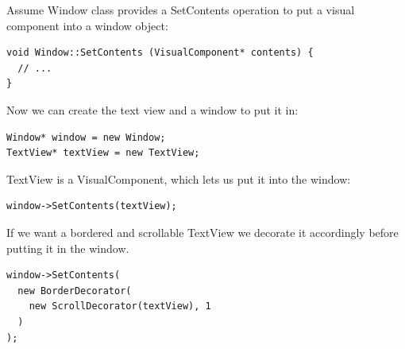 \documentclass[11pt]{report}
\begin{document}
Assume Window class provides a SetContents operation to put a visual component into a window object:
\begin{lstlisting}
void Window::SetContents (VisualComponent* contents) {
  // ...
}
\end{lstlisting}

Now we can create the text view and a window to put it in:
\begin{lstlisting}
Window* window = new Window;
TextView* textView = new TextView;
\end{lstlisting}

TextView is a VisualComponent, which lets us put it into the window:
\begin{lstlisting}
window->SetContents(textView);
\end{lstlisting}
If we want a bordered and scrollable TextView we decorate it accordingly before putting it in the window.
\begin{lstlisting}
window->SetContents(
  new BorderDecorator(
    new ScrollDecorator(textView), 1
  )
);
\end{lstlisting}
\end{document}
